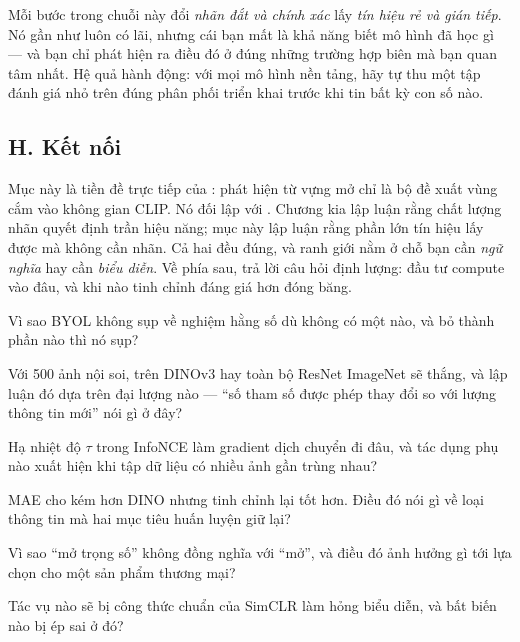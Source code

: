 \documentclass[../../../deep_learning.tex]{subfiles}
\begin{document}
\begin{cannho}
Mỗi bước trong chuỗi này đổi \emph{nhãn đắt và chính xác} lấy \emph{tín hiệu rẻ và gián tiếp}. Nó gần như luôn có lãi, nhưng cái bạn mất là khả năng biết mô hình đã học gì --- và bạn chỉ phát hiện ra điều đó ở đúng những trường hợp biên mà bạn quan tâm nhất. Hệ quả hành động: với mọi mô hình nền tảng, hãy tự thu một tập đánh giá nhỏ trên đúng phân phối triển khai trước khi tin bất kỳ con số nào. 
\end{cannho}

\subsection{H. Kết nối}
Mục này là tiền đề trực tiếp của : phát hiện từ vựng mở chỉ là bộ đề xuất vùng cắm vào không gian  CLIP. Nó đối lập với . Chương kia lập luận rằng chất lượng nhãn quyết định trần hiệu năng; mục này lập luận rằng phần lớn tín hiệu lấy được mà không cần nhãn. Cả hai đều đúng, và ranh giới nằm ở chỗ bạn cần \emph{ngữ nghĩa} hay cần \emph{biểu diễn}. Về phía sau,  trả lời câu hỏi định lượng: đầu tư compute vào đâu, và khi nào tinh chỉnh đáng giá hơn đóng băng.

\begin{tukiem}
\item Vì sao BYOL không sụp về nghiệm hằng số dù không có một  nào, và bỏ thành phần nào thì nó sụp?
\item Với 500 ảnh nội soi,  trên DINOv3 hay  toàn bộ ResNet ImageNet sẽ thắng, và lập luận đó dựa trên đại lượng nào --- ``số tham số được phép thay đổi so với lượng thông tin mới'' nói gì ở đây?
\item Hạ nhiệt độ $\tau$ trong InfoNCE làm gradient dịch chuyển đi đâu, và tác dụng phụ nào xuất hiện khi tập dữ liệu có nhiều ảnh gần trùng nhau?
\item MAE cho  kém hơn DINO nhưng tinh chỉnh lại tốt hơn. Điều đó nói gì về loại thông tin mà hai mục tiêu huấn luyện giữ lại?
\item Vì sao ``mở trọng số'' không đồng nghĩa với ``mở'', và điều đó ảnh hưởng gì tới lựa chọn  cho một sản phẩm thương mại?
\item Tác vụ nào sẽ bị công thức  chuẩn của SimCLR làm hỏng biểu diễn, và bất biến nào bị ép sai ở đó?
\end{tukiem}
\ifSubfilesClassLoaded{\printbibliography[title={Nguồn}]}{}
\end{document}
